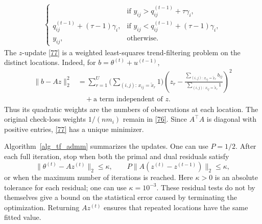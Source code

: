 \documentclass[twoside,11pt]{article}
\newenvironment{revision}{\color{revisionred}}{}
\begin{document}
\begin{revision}
\begin{align}
\begin{cases}
      & \text{if } y_{ij}>q_{ij}^{(t-1)}+\tau\gamma_i,\\
    q_{ij}^{(t-1)}+(\tau-1)\gamma_i,
      & \text{if } y_{ij}<q_{ij}^{(t-1)}+(\tau-1)\gamma_i,\\
    y_{ij}, & \text{otherwise}.
\end{cases}
\end{align}
The \(z\)-update \eqref{77} is a weighted least-squares trend-filtering
problem on the distinct locations. Indeed, for \(b=\theta^{(t)}+u^{(t-1)}\),
\[
\begin{aligned}
\|b-Az\|_2^2
&=\sum_{r=1}^U
\biggl(\sum_{(i,j):\,x_{ij}=\tilde x_r}1\biggr)
\left(
z_r-\frac{\sum_{(i,j):\,x_{ij}=\tilde x_r}b_{ij}}
{\sum_{(i,j):\,x_{ij}=\tilde x_r}1}
\right)^2\\
&\quad+\text{a term independent of }z.
\end{aligned}
\]
Thus its quadratic weights are the numbers of observations at each
location. The original check-loss weights \(1/(nm_i)\) remain in
\eqref{76}. Since \(A^\top A\) is diagonal with positive entries,
\eqref{77} has a unique minimizer.

Algorithm~\ref{alg_tf_admm} summarizes the updates. One can use \(P=1/2\).
After each full iteration, stop when both the primal and dual residuals
satisfy
\begin{equation}
\label{eq:tf_stop}
\|\theta^{(t)}-Az^{(t)}\|_2\leq\kappa,
\qquad
P\|A(z^{(t)}-z^{(t-1)})\|_2\leq\kappa,
\end{equation}
or when the maximum number of iterations is reached. Here \(\kappa>0\)
is an absolute tolerance for each residual; one can use \(\kappa=10^{-3}\).
These residual tests do not by themselves give a bound on the statistical
error caused by terminating the optimization. Returning \(Az^{(t)}\)
ensures that repeated locations have the same fitted value.
\end{revision}
\end{document}
